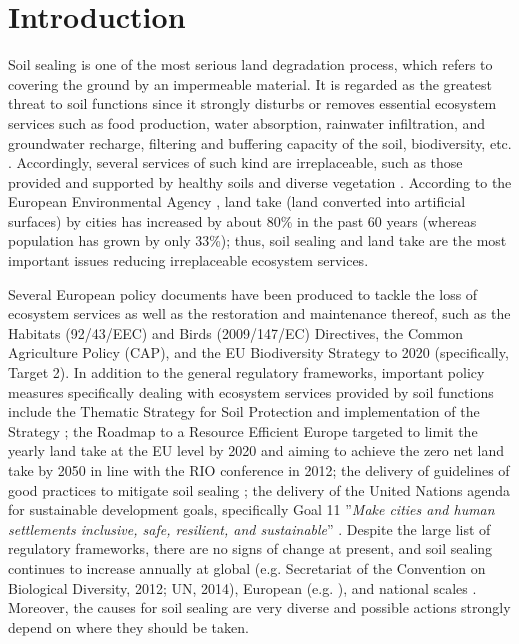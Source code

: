 \documentclass[APA,LATO1COL,doublespace]{WileyNJD-v2}
\begin{document}

\section{Introduction}\label{sec1}
Soil sealing is one of the most serious land degradation process, which refers to covering the ground by an impermeable material.
It is regarded as the greatest threat to soil functions since it strongly disturbs or removes essential ecosystem services such as food production, water absorption, rainwater infiltration, and groundwater recharge, filtering and buffering capacity of the soil, biodiversity, etc. \citep{FAO15}.
Accordingly, several services of such kind are irreplaceable, such as those provided and supported by healthy soils and diverse vegetation \citep{Dunbar13}.
According to the European Environmental Agency \citep{EEA2011}, land take (land converted into artificial surfaces) by cities has increased by about 80\% in the past 60 years (whereas population has grown by only 33\%); thus, soil sealing and land take are the most important issues reducing irreplaceable ecosystem services.

Several European policy documents have been produced to tackle the loss of ecosystem services as well as the restoration and maintenance thereof, such as the Habitats (92/43/EEC) and Birds (2009/147/EC) Directives, the Common Agriculture Policy (CAP), and the EU Biodiversity Strategy to 2020 (specifically, Target 2).
In addition to the general regulatory frameworks, important policy measures specifically dealing with ecosystem services provided by soil functions include the Thematic Strategy for Soil Protection \citep{EC2006} and implementation of the Strategy \citep{EC2012}; the Roadmap to a Resource Efficient Europe \citep{EC2011a} targeted to limit the yearly land take at the EU level by 2020 and aiming to achieve the zero net land take by 2050 in line with the RIO conference in 2012; the delivery of guidelines of good practices to mitigate soil sealing \citep{SWD12}; the delivery of the United Nations agenda \citep{UN15} for sustainable development goals, specifically Goal 11 ''\textit{Make cities and human settlements inclusive, safe, resilient, and sustainable}'' \citep{Keesstra16}.
Despite the large list of regulatory frameworks, there are no signs of change at present, and soil sealing continues to increase annually \citep{FAO15} at global (e.g. Secretariat of the Convention on Biological Diversity, 2012; UN, 2014), European (e.g. \citealp{SWD12}), and national scales \citep[e.g.][Copernicus Land Monitoring Service\footnote{ http://land.copernicus.eu}]{ISPRA16,ISPRA18}.
Moreover, the causes for soil sealing are very diverse and possible actions strongly depend on where they should be taken.
\end{document}

